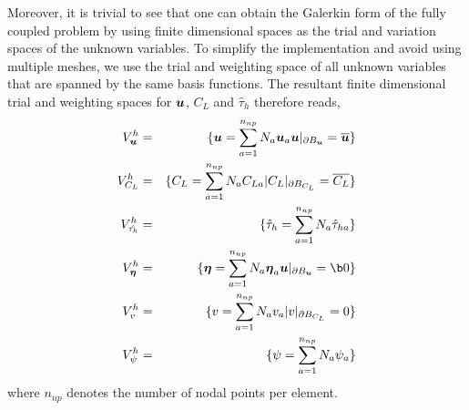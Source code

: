 \documentclass[10pt]{elsarticle}
\newcommand{\mbs}[1]{\boldsymbol{#1}}
\def\beeta{{\mbs{\eta}}}
\begin{document}
Moreover, it is trivial to see that one can obtain the Galerkin form of the fully coupled problem by
 using finite dimensional spaces as the trial and variation spaces of the unknown variables.
To simplify the implementation and avoid using multiple meshes, 
we use the trial and  weighting space of all unknown variables that are spanned by the same basis functions. 
The resultant finite dimensional trial and weighting spaces for $\bu$, $C_{L}$ and $\hat{\tau}_{h}$  therefore reads, 
\begin{eqnarray}
    \label{eq.DisTrialSpaceAndVariation}
      V_{\bu}^{h} &=& \{ \bu = \sum_{a=1}^{n_{np}} N_{a} \bu_{a}  \bu|_{\partial B_{\bu}} = \overline{\bu} \} \nonumber \\
       V_{C_{L}}^{h} &=& \{ C_{L} = \sum_{a=1}^{n_{np}} N_{a} C_{La} |  C_{L}|_{\partial B_{C_{L}}} = \overline{C_{L}} \} \\
      V_{\hat{\tau_{h}}}^{h} &=& \{ \hat{\tau}_{h} =  \sum_{a=1}^{n_{np}} N_{a}  \hat{\tau}_{ha} \} \nonumber \\
    \label{eq.DisVariation}
      V_{\beeta}^{h} &=& \{ \beeta = \sum_{a=1}^{n_{np}} N_{a} \beeta_{a}  \bu|_{\partial B_{\bu}} = \b0 \} \nonumber \\
      V_{v}^{h} &=& \{ v = \sum_{a=1}^{n_{np}} N_{a} v_{a} |  v|_{\partial B_{C_{L}}} = 0 \} \\
      V_{\psi}^{h} &=& \{ \psi =  \sum_{a=1}^{n_{np}} N_{a}  \psi_{a} \} \nonumber 
      \nonumber 
      \label{eq:varp}
    \end{eqnarray}
where $n_{np}$ denotes the number of nodal points per element.     
\end{document}
